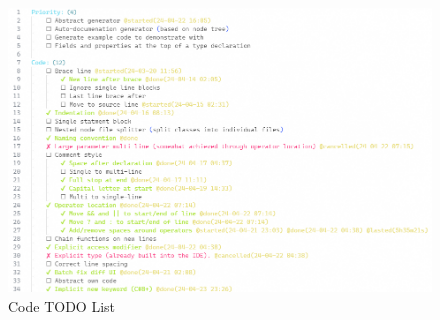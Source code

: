 \begin{figure}
    \centering
    \caption{Code TODO List}
    \label{fig:CodeTodoList}
    \includegraphics[width=0.7\textheight]{Figures/CodeTodo.png}
\end{figure}

